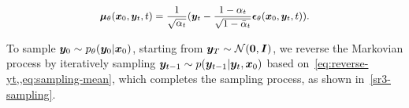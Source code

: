 \vspace{-.2in}
\begin{align}\label{eq:sampling-mean}
\small
    {\bm{\mu}}_{\mathbf{\theta}}({\bm{x}}_0,{\bm{y}}_t, t) = \frac{1}{\sqrt{\alpha_t}}({\bm{y}}_t-\frac{1-\alpha_t}{\sqrt{1-\bar{\alpha}_t}}\bm{{\mathbf{\epsilon}}}_{\mathbf{\theta}}({\bm{x}}_0,{\bm{y}}_t, t)).
\end{align}
\vspace{-.15in}

\noindent
To sample ${\bm{y}}_0\sim p_\theta({\bm{y}}_0| {\bm{x}}_0)$, starting from ${\bm{y}}_T\sim\mathcal{N}(\bm0, \bm I)$, we reverse the Markovian process by iteratively sampling ${\bm{y}}_{t-1}\sim p({\bm{y}}_{t-1}| {\bm{y}}_{t}, {\bm{x}}_0)$ based on~\cref{eq:reverse-yt,,eq:sampling-mean}, which completes the sampling process, as shown in~\cref{sr3-sampling}.


